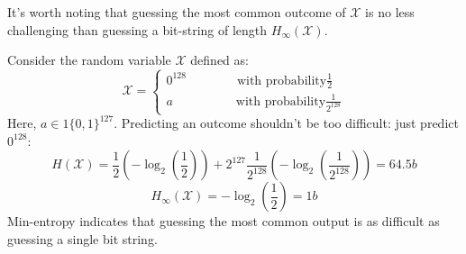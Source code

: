 It's worth noting that guessing the most common outcome of $\mathcal{X}$ is no less challenging than guessing a bit-string of length $H_\infty(\mathcal{X})$.
\begin{example}
    Consider the random variable $\mathcal{X}$ defined as:
    \[\mathcal{X}=\begin{cases}
        0^{128}  \qquad \qquad          \text{with probability} \frac{1}{2}\\
        a        \quad \qquad \qquad    \text{with probability} \frac{1}{2^{128}}
    \end{cases}\]
    Here, $a \in 1\{0,1\}^{127}$.
    Predicting an outcome shouldn't be too difficult: just predict $0^{128}$:
    \[H(\mathcal{X})=\dfrac{1}{2}\left(-\log_2\left(\dfrac{1}{2}\right)\right)+2^{127}\frac{1}{2^{128}}\left(-\log_2\left(\frac{1}{2^{128}}\right)\right)= 64.5b\]
    \[H_\infty(\mathcal{X})=-\log_2\left(\dfrac{1}{2}\right)=1b\]
    Min-entropy indicates that guessing the most common output is as difficult as guessing a single bit string.
\end{example}